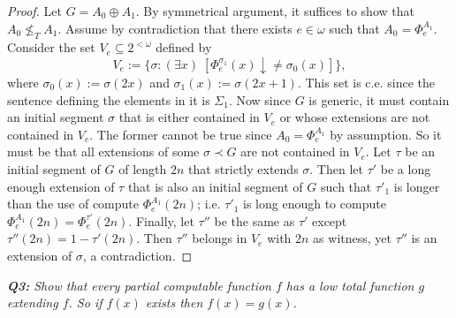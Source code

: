 \documentclass{article}
\begin{document}
\begin{proof}
    Let $G=A_0\oplus A_1$. By symmetrical argument, it suffices to show
    that $A_0\not\leq_T A_1$. Assume by contradiction that there exists
    $e\in\omega$ such that $A_0=\Phi_e^{A_1}$. Consider the set
    $V_e\subseteq 2^{<\omega}$ defined by
    \[V_e :=\{\sigma: (\exists x)\; [\Phi_e^{\sigma_1}(x) \downarrow\neq
    \sigma_0(x)]\},\]
    where $\sigma_0(x):=\sigma(2x)$ and $\sigma_1(x):=\sigma(2x+1)$. This
    set is c.e. since the sentence defining the elements in it is
    $\Sigma_1$. Now since $G$ is generic, it
    must contain an initial segment $\sigma$ that is either contained in
    $V_e$ or whose extensions are not contained in $V_e$. The former cannot
    be true since $A_0=\Phi_e^{A_1}$ by assumption. So it must be that all
    extensions of some $\sigma\prec G$ are not contained in $V_e$. Let
    $\tau$ be an initial segment of $G$ of length $2n$ that strictly extends
    $\sigma$. Then let $\tau'$ be a long enough extension of $\tau$ that is
    also an initial segment of $G$ such that $\tau'_1$ is longer than the
    use of compute $\Phi_e^{A_1}(2n)$; i.e. $\tau'_1$ is long enough to
    compute $\Phi_e^{A_1}(2n) =\Phi_e^{\tau'}(2n)$. Finally, let $\tau''$
    be the same as $\tau'$ except $\tau''(2n)=1-\tau'(2n)$. Then $\tau''$
    belongs in $V_e$ with $2n$ as witness, yet $\tau''$ is an extension of
    $\sigma$, a contradiction.
  \end{proof}

\it \textbf{Q3:} Show that every partial computable function $f$ has a low
  total function $g$ extending $f$. So if $f(x)$ exists then $f(x)=g(x)$.
\end{document}
